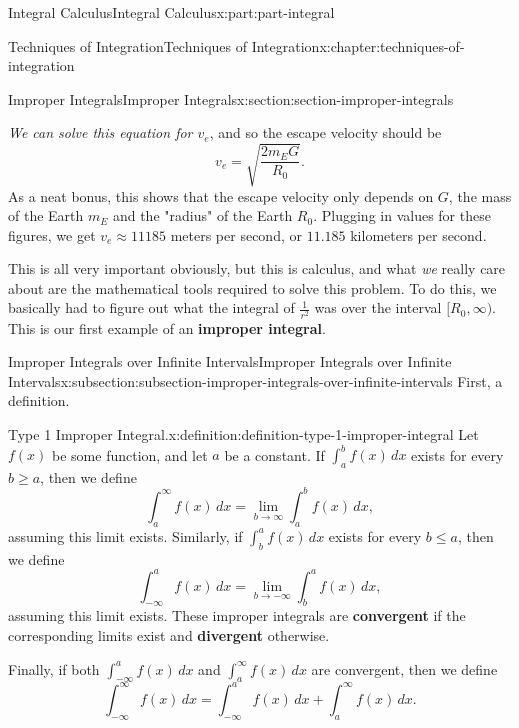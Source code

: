 \documentclass[twoside,10pt,]{tufte-book}
\newcommand{\terminology}[1]{\textbf{#1}}
\numberwithin{equation}{part}
\begin{document}
\begin{partptx}{Integral Calculus}{}{Integral Calculus}{}{}{x:part:part-integral}
\begin{chapterptx}{Techniques of Integration}{}{Techniques of Integration}{}{}{x:chapter:techniques-of-integration}
\begin{sectionptx}{Improper Integrals}{}{Improper Integrals}{}{}{x:section:section-improper-integrals}
\begin{introduction}{}
\begin{equation*}
\end{equation*}
\emph{We can solve this equation for \(v_{e}\)}, and so the escape velocity should be%
\begin{equation*}
v_{e} = \sqrt{\frac{2 m_{E}G}{R_{0}}}.
\end{equation*}
As a neat bonus, this shows that the escape velocity only depends on \(G\), the mass of the Earth \(m_{E}\) and the "radius" of the Earth \(R_{0}\). Plugging in values for these figures, we get \(v_{e} \approx 11185\) meters per second, or \(11.185\) kilometers per second.%
\par
This is all very important obviously, but this is calculus, and what \emph{we} really care about are the mathematical tools required to solve this problem. To do this, we basically had to figure out what the integral of \(\frac{1}{r^{2}}\) was over the interval \([R_{0},\infty)\). This is our first example of an \terminology{improper integral}.%
\end{introduction}%
%
%
\typeout{************************************************}
\typeout{************************************************}
%
\begin{subsectionptx}{Improper Integrals over Infinite Intervals}{}{Improper Integrals over Infinite Intervals}{}{}{x:subsection:subsection-improper-integrals-over-infinite-intervals}
First, a definition.%
\begin{definition}{Type 1 Improper Integral.}{x:definition:definition-type-1-improper-integral}%
Let \(f(x)\) be some function, and let \(a\) be a constant. If \(\int_{a}^{b}f(x)\,dx\) exists for every \(b\geq a\), then we define%
\begin{equation*}
\int_{a}^{\infty}f(x)\,dx = \lim_{b\to\infty}\int_{a}^{b}f(x)\,dx,
\end{equation*}
assuming this limit exists. Similarly, if \(\int_{b}^{a}f(x)\,dx\) exists for every \(b\leq a\), then we define%
\begin{equation*}
\int_{-\infty}^{a}f(x)\,dx = \lim_{b\to-\infty}\int_{b}^{a}f(x)\,dx,
\end{equation*}
assuming this limit exists. These improper integrals are \terminology{convergent} if the corresponding limits exist and \terminology{divergent} otherwise.%
\par
Finally, if both \(\int_{-\infty}^{a}f(x)\,dx\) and \(\int_{a}^{\infty}f(x)\,dx\) are convergent, then we define%
\begin{equation*}
\int_{-\infty}^{\infty}f(x)\,dx = \int_{-\infty}^{a}f(x)\,dx + \int_{a}^{\infty}f(x)\,dx.

\end{equation*}
\end{definition}
\end{subsectionptx}
\end{sectionptx}
\end{chapterptx}
\end{partptx}
\end{document}
